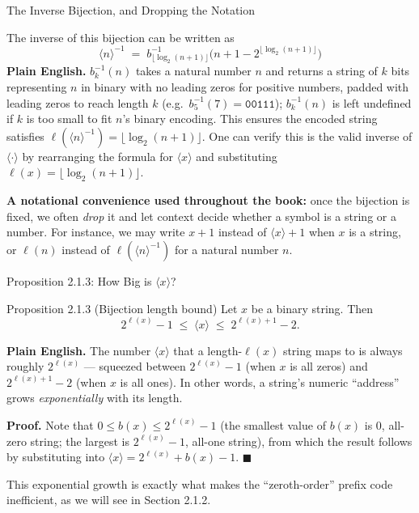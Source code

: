 \documentclass[aspectratio=169,10pt]{beamer}
\newcommand{\len}{\ell}
\newcommand{\bij}[1]{\langle #1\rangle}
\begin{document}
\begin{frame}{The Inverse Bijection, and Dropping the Notation}

The inverse of this bijection can be written as
\[
  \bij{n}^{-1} \;=\; b^{-1}_{\lfloor\log_2(n+1)\rfloor}\bigl(n+1-2^{\lfloor\log_2(n+1)\rfloor}\bigr)
  \tag{2.1.2}
\]
\textbf{Plain English.} $b_k^{-1}(n)$ takes a natural number $n$ and
returns a string of $k$ bits representing $n$ in binary with no leading
zeros for positive numbers, padded with leading zeros to reach length $k$
(e.g.\ $b_5^{-1}(7)=\texttt{00111}$); $b_k^{-1}(n)$ is left undefined if $k$
is too small to fit $n$'s binary encoding. This ensures the encoded string
satisfies $\len(\bij{n}^{-1})=\lfloor\log_2(n+1)\rfloor$. One can verify
this is the valid inverse of $\bij{\cdot}$ by rearranging the formula for
$\bij{x}$ and substituting $\len(x)=\lfloor\log_2(n+1)\rfloor$.

\medskip
\textbf{A notational convenience used throughout the book:} once the
bijection is fixed, we often \emph{drop} it and let context decide whether
a symbol is a string or a number. For instance, we may write $x+1$ instead
of $\bij{x}+1$ when $x$ is a string, or $\len(n)$ instead of
$\len(\bij{n}^{-1})$ for a natural number $n$.
\end{frame}

\begin{frame}{Proposition 2.1.3: How Big is $\bij{x}$?}

\begin{block}{Proposition 2.1.3 (Bijection length bound)}
Let $x$ be a binary string. Then
\[
  2^{\len(x)} - 1 \;\leq\; \bij{x} \;\leq\; 2^{\len(x)+1} - 2 .
\]
\end{block}

\textbf{Plain English.} The number $\bij{x}$ that a length-$\len(x)$ string
maps to is always roughly $2^{\len(x)}$ --- squeezed between
$2^{\len(x)}-1$ (when $x$ is all zeros) and $2^{\len(x)+1}-2$ (when $x$ is
all ones). In other words, a string's numeric ``address'' grows
\emph{exponentially} with its length.

\medskip
\textbf{Proof.} Note that $0\leq b(x)\leq 2^{\len(x)}-1$ (the smallest
value of $b(x)$ is $0$, all-zero string; the largest is $2^{\len(x)}-1$,
all-one string), from which the result follows by substituting into
$\bij{x}=2^{\len(x)}+b(x)-1$. $\blacksquare$

\medskip
This exponential growth is exactly what makes the ``zeroth-order'' prefix
code inefficient, as we will see in Section 2.1.2.
\end{frame}
\end{document}
